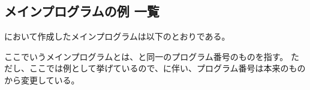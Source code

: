 






\subsection{メインプログラムの例 一覧}
\DMC において作成したメインプログラムは以下のとおりである。
\begin{marker}
ここでいうメインプログラムとは、\DrawingNumber と同一のプログラム番号のものを指す。
ただし、ここでは例として挙げているので、に伴い、プログラム番号は本来のものから変更している。
\end{marker}

